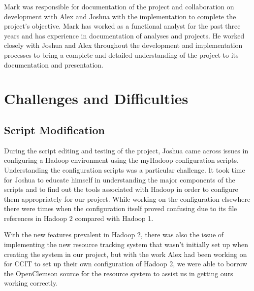 \documentclass[conference]{IEEEtran}
\begin{document}
			Mark was responsible for documentation of the project and collaboration on development with Alex and Joshua with the implementation to complete the project's objective. Mark has worked as a functional analyst for the past three years and has experience in documentation of analyses and projects. He worked closely with Joshua and Alex throughout the development and implementation processes to bring a complete and detailed understanding of the project to its documentation and presentation.

		\section{Challenges and Difficulties}
			\subsection{Script Modification}
				During the script editing and testing of the project, Joshua came across issues in configuring a Hadoop environment using the myHadoop configuration scripts. Understanding the configuration scripts was a particular challenge. It took time for Joshua to educate himself in understanding the major components of the scripts and to find out the tools associated with Hadoop in order to configure them appropriately for our project. While working on the configuration elsewhere there were times when the configuration itself proved confusing due to its file references in Hadoop 2 compared with Hadoop 1. 

                With the new features prevalent in Hadoop 2, there was also the issue of implementing the new resource tracking system that wasn’t initially set up when creating the system in our project, but with the work Alex had been working on for CCIT to set up their own configuration of Hadoop 2, we were able to borrow the OpenClemson source\cite{openclemson} for the resource system to assist us in getting ours working correctly.
\end{document}
